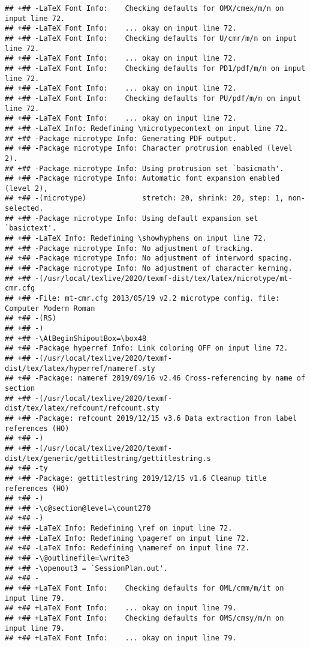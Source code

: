 \documentclass[ignorenonframetext,]{beamer}
\begin{document}
\begin{verbatim}
## +## -LaTeX Font Info:    Checking defaults for OMX/cmex/m/n on input line 72.
## +## -LaTeX Font Info:    ... okay on input line 72.
## +## -LaTeX Font Info:    Checking defaults for U/cmr/m/n on input line 72.
## +## -LaTeX Font Info:    ... okay on input line 72.
## +## -LaTeX Font Info:    Checking defaults for PD1/pdf/m/n on input line 72.
## +## -LaTeX Font Info:    ... okay on input line 72.
## +## -LaTeX Font Info:    Checking defaults for PU/pdf/m/n on input line 72.
## +## -LaTeX Font Info:    ... okay on input line 72.
## +## -LaTeX Info: Redefining \microtypecontext on input line 72.
## +## -Package microtype Info: Generating PDF output.
## +## -Package microtype Info: Character protrusion enabled (level 2).
## +## -Package microtype Info: Using protrusion set `basicmath'.
## +## -Package microtype Info: Automatic font expansion enabled (level 2),
## +## -(microtype)             stretch: 20, shrink: 20, step: 1, non-selected.
## +## -Package microtype Info: Using default expansion set `basictext'.
## +## -LaTeX Info: Redefining \showhyphens on input line 72.
## +## -Package microtype Info: No adjustment of tracking.
## +## -Package microtype Info: No adjustment of interword spacing.
## +## -Package microtype Info: No adjustment of character kerning.
## +## -(/usr/local/texlive/2020/texmf-dist/tex/latex/microtype/mt-cmr.cfg
## +## -File: mt-cmr.cfg 2013/05/19 v2.2 microtype config. file: Computer Modern Roman 
## +## -(RS)
## +## -)
## +## -\AtBeginShipoutBox=\box48
## +## -Package hyperref Info: Link coloring OFF on input line 72.
## +## -(/usr/local/texlive/2020/texmf-dist/tex/latex/hyperref/nameref.sty
## +## -Package: nameref 2019/09/16 v2.46 Cross-referencing by name of section
## +## -(/usr/local/texlive/2020/texmf-dist/tex/latex/refcount/refcount.sty
## +## -Package: refcount 2019/12/15 v3.6 Data extraction from label references (HO)
## +## -)
## +## -(/usr/local/texlive/2020/texmf-dist/tex/generic/gettitlestring/gettitlestring.s
## +## -ty
## +## -Package: gettitlestring 2019/12/15 v1.6 Cleanup title references (HO)
## +## -)
## +## -\c@section@level=\count270
## +## -)
## +## -LaTeX Info: Redefining \ref on input line 72.
## +## -LaTeX Info: Redefining \pageref on input line 72.
## +## -LaTeX Info: Redefining \nameref on input line 72.
## +## -\@outlinefile=\write3
## +## -\openout3 = `SessionPlan.out'.
## +## -
## +## +LaTeX Font Info:    Checking defaults for OML/cmm/m/it on input line 79.
## +## +LaTeX Font Info:    ... okay on input line 79.
## +## +LaTeX Font Info:    Checking defaults for OMS/cmsy/m/n on input line 79.
## +## +LaTeX Font Info:    ... okay on input line 79.

\end{verbatim}
\end{document}
